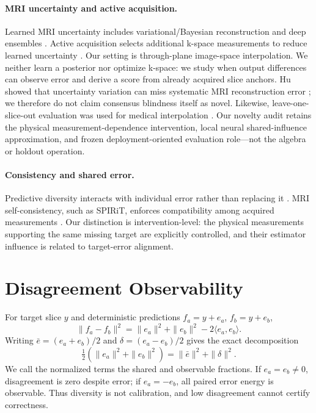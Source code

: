 \documentclass[10pt,twocolumn,letterpaper]{article}
\begin{document}
\paragraph{MRI uncertainty and active acquisition.} Learned MRI uncertainty includes variational/Bayesian reconstruction and deep ensembles \cite{narnhofer2022bayesian,kustner2024ensembles}. Active acquisition selects additional k-space measurements to reduce learned uncertainty \cite{zhang2019active}. Our setting is through-plane image-space interpolation. We neither learn a posterior nor optimize k-space: we study when output differences can observe error and derive a score from already acquired slice anchors.
Hu \etal showed that uncertainty variation can miss systematic MRI reconstruction error \cite{hu2021predict}; we therefore do not claim consensus blindness itself as novel. Likewise, leave-one-slice-out evaluation was used for medical interpolation \cite{horvath2017highorder}. Our novelty audit retains the physical measurement-dependence intervention, local neural shared-influence approximation, and frozen deployment-oriented evaluation role---not the algebra or holdout operation.

\paragraph{Consistency and shared error.} Predictive diversity interacts with individual error rather than replacing it \cite{brown2005diversity,ortega2022diversity}. MRI self-consistency, such as SPIRiT, enforces compatibility among acquired measurements \cite{lustig2010spirit}. Our distinction is intervention-level: the physical measurements supporting the same missing target are explicitly controlled, and their estimator influence is related to target-error alignment.

\section{Disagreement Observability}
For target slice $y$ and deterministic predictions $f_a=y+e_a$, $f_b=y+e_b$,
\begin{equation}
\|f_a-f_b\|^2=\|e_a\|^2+\|e_b\|^2-2\langle e_a,e_b\rangle. \label{eq:diff}
\end{equation}
Writing $\bar e=(e_a+e_b)/2$ and $\delta=(e_a-e_b)/2$ gives the exact decomposition
\begin{equation}
\tfrac12(\|e_a\|^2+\|e_b\|^2)=\|\bar e\|^2+\|\delta\|^2. \label{eq:decomp}
\end{equation}
We call the normalized terms the shared and observable fractions. If $e_a=e_b\ne0$, disagreement is zero despite error; if $e_a=-e_b$, all paired error energy is observable. Thus diversity is not calibration, and low disagreement cannot certify correctness.
\end{document}

